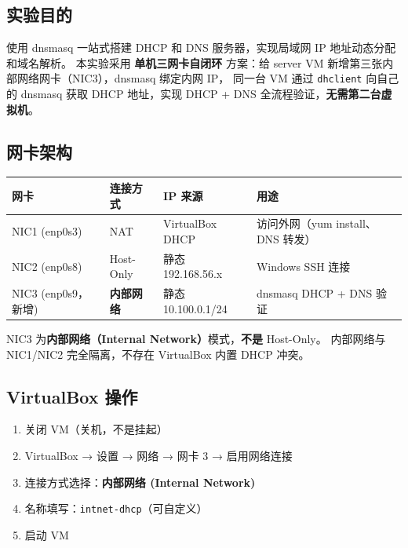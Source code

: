 \documentclass[12pt,a4paper]{ctexart}
\begin{document}
\subsection{实验目的}

使用 dnsmasq 一站式搭建 DHCP 和 DNS 服务器，实现局域网 IP 地址动态分配和域名解析。
本实验采用 \textbf{单机三网卡自闭环} 方案：给 server VM 新增第三张内部网络网卡（NIC3），dnsmasq 绑定内网 IP，
同一台 VM 通过 \texttt{dhclient} 向自己的 dnsmasq 获取 DHCP 地址，实现 DHCP + DNS 全流程验证，\textbf{无需第二台虚拟机}。

\subsection{网卡架构}

\begin{table}[h]
\centering
\begin{tabular}{p{2.4cm}p{2.8cm}p{2.8cm}p{4.6cm}}
\toprule
网卡 & 连接方式 & IP 来源 & 用途 \\
\midrule
NIC1 (enp0s3) & NAT & VirtualBox DHCP & 访问外网（yum install、DNS 转发）\\
NIC2 (enp0s8) & Host-Only & 静态 192.168.56.x & Windows SSH 连接 \\
NIC3 (enp0s9，新增) & \textbf{内部网络} & 静态 10.100.0.1/24 & dnsmasq DHCP + DNS 验证 \\
\bottomrule
\end{tabular}
\end{table}

\begin{warnbox}
  NIC3 为\textbf{内部网络（Internal Network）}模式，\textbf{不是} Host-Only。
  内部网络与 NIC1/NIC2 完全隔离，不存在 VirtualBox 内置 DHCP 冲突。
\end{warnbox}

\subsection{VirtualBox 操作}

\begin{enumerate}[label=\arabic*.,leftmargin=*]
  \item 关闭 VM（关机，不是挂起）
  \item VirtualBox → 设置 → 网络 → 网卡 3 → 启用网络连接
  \item 连接方式选择：\textbf{内部网络 (Internal Network)}
  \item 名称填写：\texttt{intnet-dhcp}（可自定义）
  \item 启动 VM
\end{enumerate}
\end{document}
